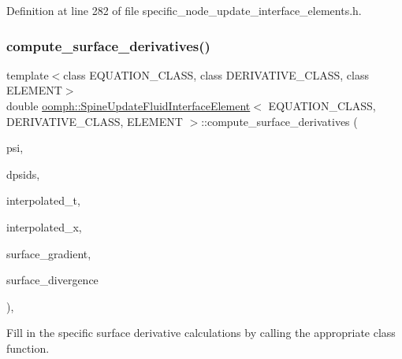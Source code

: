 Definition at line 282 of file specific\+\_\+node\+\_\+update\+\_\+interface\+\_\+elements.\+h.

\mbox{\label{classoomph_1_1SpineUpdateFluidInterfaceElement_a75debcd348674d5ea58bfefc0e72b737}} 
\subsubsection{\texorpdfstring{compute\+\_\+surface\+\_\+derivatives()}{compute\_surface\_derivatives()}}
{\footnotesize\ttfamily template$<$class E\+Q\+U\+A\+T\+I\+O\+N\+\_\+\+C\+L\+A\+SS, class D\+E\+R\+I\+V\+A\+T\+I\+V\+E\+\_\+\+C\+L\+A\+SS, class E\+L\+E\+M\+E\+NT$>$ \\
double \hyperlink{classoomph_1_1SpineUpdateFluidInterfaceElement}{oomph\+::\+Spine\+Update\+Fluid\+Interface\+Element}$<$ E\+Q\+U\+A\+T\+I\+O\+N\+\_\+\+C\+L\+A\+SS, D\+E\+R\+I\+V\+A\+T\+I\+V\+E\+\_\+\+C\+L\+A\+SS, E\+L\+E\+M\+E\+NT $>$\+::compute\+\_\+surface\+\_\+derivatives (\begin{DoxyParamCaption}\item[{const \hyperlink{classoomph_1_1Shape}{Shape} \&}]{psi,  }\item[{const \hyperlink{classoomph_1_1DShape}{D\+Shape} \&}]{dpsids,  }\item[{const \hyperlink{classoomph_1_1DenseMatrix}{Dense\+Matrix}$<$ double $>$ \&}]{interpolated\+\_\+t,  }\item[{const \hyperlink{classoomph_1_1Vector}{Vector}$<$ double $>$ \&}]{interpolated\+\_\+x,  }\item[{\hyperlink{classoomph_1_1DShape}{D\+Shape} \&}]{surface\+\_\+gradient,  }\item[{\hyperlink{classoomph_1_1DShape}{D\+Shape} \&}]{surface\+\_\+divergence }\end{DoxyParamCaption})\hspace{0.3cm}{\ttfamily [inline]}, {\ttfamily [protected]}}



Fill in the specific surface derivative calculations by calling the appropriate class function. 



